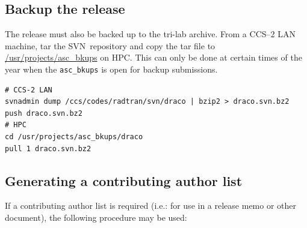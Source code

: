 \documentclass[note]{newmemo}
\newcommand{\svn}{\textsf{SVN}}
\begin{document}

\subsection{Backup the release}
\label{sec:backup_rel}


The release must also be backed up to the tri-lab archive.  From a
CCS--2 LAN machine, tar the \svn\ repository and copy the tar file to
\url{/usr/projects/asc\_bkups} on HPC.  This can only be done at
certain times of the year when the \texttt{asc\_bkups} is open for
backup submissions. 
\begin{lstlisting}[basicstyle=\footnotesize, xleftmargin=1.0in, 
  xrightmargin=1.00in]
# CCS-2 LAN
svnadmin dump /ccs/codes/radtran/svn/draco | bzip2 > draco.svn.bz2
push draco.svn.bz2
# HPC
cd /usr/projects/asc_bkups/draco
pull 1 draco.svn.bz2
\end{lstlisting}


\subsection{Generating a contributing author list}
\label{sec:author_list}

If a contributing author list is required (i.e.: for use in a release
memo or other document), the following procedure may be used:
\end{document}
